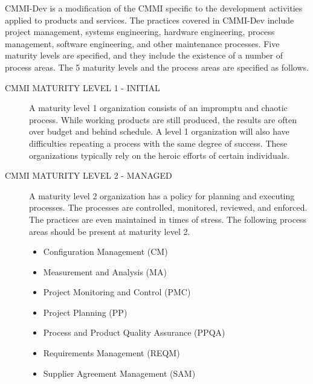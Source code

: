 \documentclass[SDSUThesis.tex]{subfiles}
\begin{document}
    CMMI-Dev is a modification of the CMMI specific to the 
    development activities applied to products
    and services.  The practices covered in 
    CMMI-Dev include project management, 
    systems engineering, hardware engineering, process 
    management, software engineering, and 
    other maintenance processes.  Five maturity levels are 
    specified, and they include the 
    existence of a number of process areas.  The 5 maturity 
    levels and the process areas are specified as follows.

    \begin{description}
        \item[CMMI MATURITY LEVEL 1 - INITIAL]
            A maturity level 1 organization consists of an
                impromptu and chaotic process.  While working
                products are still produced, the results are 
                often over budget and behind schedule.  A level
                1 organization will also have difficulties 
                repeating a process with the same degree of 
                success.  These organizations typically rely 
                on the heroic efforts of certain individuals. 
            
        \item[CMMI MATURITY LEVEL 2 - MANAGED]
            A maturity level 2 organization has a policy for 
            planning and executing processes.  
            The processes are controlled, monitored, 
            reviewed, and enforced.  The practices are even
            maintained in times of stress.  The following 
            process areas should be present at maturity
            level 2.
            \begin{itemize}
                \item Configuration Management (CM)
                \item Measurement and Analysis (MA)
                \item Project Monitoring and Control (PMC)
                \item Project Planning (PP)
                \item Process and Product Quality Assurance (PPQA)
                \item Requirements Management (REQM)
                \item Supplier Agreement Management (SAM)
            \end{itemize}


\end{description}
\end{document}

